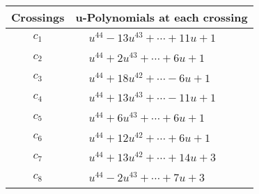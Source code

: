\documentclass[1p]{elsarticle_modified}
\theoremstyle{definition}
\begin{document}
\begin{tabular}{m{50pt}|m{274pt}}
Crossings & \hspace{64pt}u-Polynomials at each crossing \\
\hline $$\begin{aligned}c_{1}\end{aligned}$$&$\begin{aligned}
&u^{44}-13 u^{43}+\cdots+11 u+1
\end{aligned}$\\
\hline $$\begin{aligned}c_{2}\end{aligned}$$&$\begin{aligned}
&u^{44}+2 u^{43}+\cdots+6 u+1
\end{aligned}$\\
\hline $$\begin{aligned}c_{3}\end{aligned}$$&$\begin{aligned}
&u^{44}+18 u^{42}+\cdots-6 u+1
\end{aligned}$\\
\hline $$\begin{aligned}c_{4}\end{aligned}$$&$\begin{aligned}
&u^{44}+13 u^{43}+\cdots-11 u+1
\end{aligned}$\\
\hline $$\begin{aligned}c_{5}\end{aligned}$$&$\begin{aligned}
&u^{44}+6 u^{43}+\cdots+6 u+1
\end{aligned}$\\
\hline $$\begin{aligned}c_{6}\end{aligned}$$&$\begin{aligned}
&u^{44}+12 u^{42}+\cdots+6 u+1
\end{aligned}$\\
\hline $$\begin{aligned}c_{7}\end{aligned}$$&$\begin{aligned}
&u^{44}+13 u^{42}+\cdots+14 u+3
\end{aligned}$\\
\hline $$\begin{aligned}c_{8}\end{aligned}$$&$\begin{aligned}
&u^{44}-2 u^{43}+\cdots+7 u+3
\end{aligned}$\\

\end{tabular}
\end{document}
